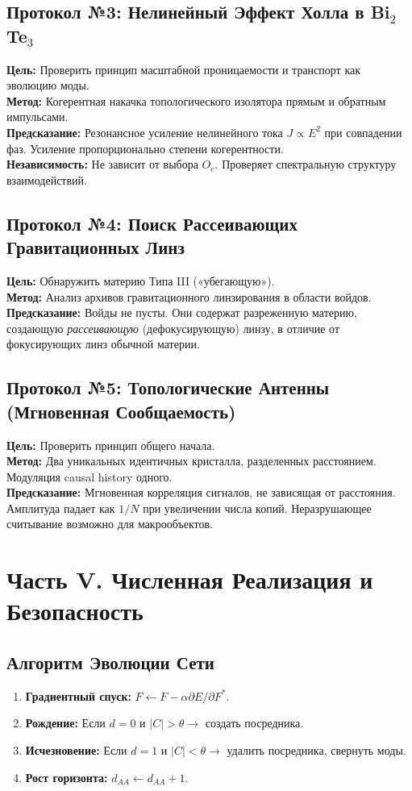 \documentclass[12pt,a4paper]{article}
\begin{document}
\subsection{Протокол №3: Нелинейный Эффект Холла в Bi$_2$Te$_3$}
\textbf{Цель:} Проверить принцип масштабной проницаемости и транспорт как эволюцию моды.\\
\textbf{Метод:} Когерентная накачка топологического изолятора прямым и обратным импульсами.\\
\textbf{Предсказание:} Резонансное усиление нелинейного тока $J \propto E^2$ при совпадении фаз. Усиление пропорционально степени когерентности.\\
\textbf{Независимость:} Не зависит от выбора $O_e$. Проверяет спектральную структуру взаимодействий.

\subsection{Протокол №4: Поиск Рассеивающих Гравитационных Линз}
\textbf{Цель:} Обнаружить материю Типа III («убегающую»).\\
\textbf{Метод:} Анализ архивов гравитационного линзирования в области войдов.\\
\textbf{Предсказание:} Войды не пусты. Они содержат разреженную материю, создающую \textit{рассеивающую} (дефокусирующую) линзу, в отличие от фокусирующих линз обычной материи.

\subsection{Протокол №5: Топологические Антенны (Мгновенная Сообщаемость)}
\textbf{Цель:} Проверить принцип общего начала.\\
\textbf{Метод:} Два уникальных идентичных кристалла, разделенных расстоянием. Модуляция causal history одного.\\
\textbf{Предсказание:} Мгновенная корреляция сигналов, не зависящая от расстояния. Амплитуда падает как $1/N$ при увеличении числа копий. Неразрушающее считывание возможно для макрообъектов.

\section{Часть V. Численная Реализация и Безопасность}

\subsection{Алгоритм Эволюции Сети}
\begin{enumerate}
    \item \textbf{Градиентный спуск:} $F \leftarrow F - \alpha \partial E / \partial F^*$.
    \item \textbf{Рождение:} Если $d=0$ и $|C| > \theta \to$ создать посредника.
    \item \textbf{Исчезновение:} Если $d=1$ и $|C| < \theta \to$ удалить посредника, свернуть моды.
    \item \textbf{Рост горизонта:} $d_{AA} \leftarrow d_{AA} + 1$.
\end{enumerate}
\end{document}

